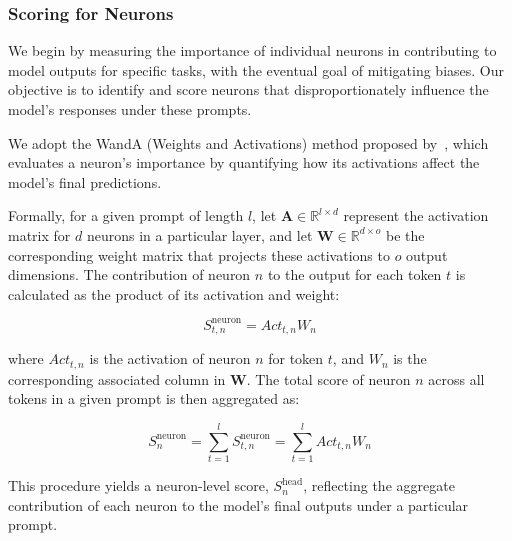 
\subsubsection{Scoring for Neurons}

We begin by measuring the importance of individual neurons in contributing to model outputs for specific tasks, with the eventual goal of mitigating biases. Our objective is to identify and score neurons that disproportionately influence the model's responses under these prompts.

We adopt the WandA (Weights and Activations) method proposed by~\textcite{sun2024simpleeffectivepruningapproach}, which evaluates a neuron's importance by quantifying how its activations affect the model's final predictions. 

Formally, for a given prompt of length $l$, let $\mathbf{A} \in \mathbb{R}^{l \times d}$ represent the activation matrix for $d$ neurons in a particular layer, and let $\mathbf{W} \in \mathbb{R}^{d \times o}$ be the corresponding weight matrix that projects these activations to $o$ output dimensions. The contribution of neuron $n$ to the output for each token $t$ is calculated as the product of its activation and weight:

\begin{equation}
    S^{\mathrm{neuron}}_{t,n} = Act_{t,n} W_{n}
\end{equation}

where $Act_{t,n}$ is the activation of neuron $n$ for token $t$, and $W_n$ is the corresponding associated column in $\mathbf{W}$. The total score of neuron $n$ across all tokens in a given prompt is then aggregated as:

\begin{equation}
    S^{\mathrm{neuron}}_n = \sum_{t=1}^{l} S^{\mathrm{neuron}}_{t,n} = \sum_{t=1}^{l} Act_{t,n} W_n
\end{equation}

This procedure yields a neuron-level score, $S^\mathrm{head}_n$, reflecting the aggregate contribution of each neuron to the model's final outputs under a particular prompt. 



